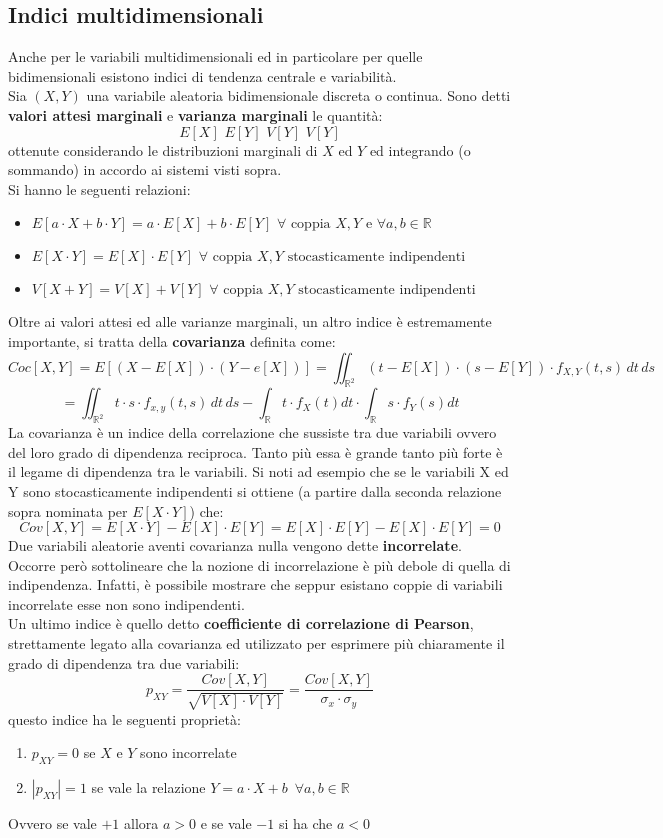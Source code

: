 \documentclass[a4paper,12pt, oneside]{book}
\begin{document}
\subsection{Indici multidimensionali}
Anche per le variabili multidimensionali ed in particolare per quelle bidimensionali esistono indici di tendenza centrale e variabilità.\\
Sia $(X,Y)$ una variabile aleatoria bidimensionale discreta o continua. Sono detti \textbf{valori attesi marginali} e \textbf{varianza marginali }le quantità:
\[E[X]\,\,E[Y]\,\,V[Y]\,\,V[Y]\]
ottenute considerando le distribuzioni marginali di $X$ ed $Y $ ed integrando (o sommando) in accordo ai sistemi visti sopra.\\
Si hanno le seguenti relazioni:
\begin{itemize}
\item $E[a\cdot X +b \cdot Y]=a\cdot E[X] + b\cdot E[Y]\,\,\forall \mbox{ coppia }X,Y \mbox{ e }\forall a,b\in\mathbb{R}$
\item $E[X \cdot Y]= E[X]\cdot E[Y]\,\,\forall \mbox{ coppia }X,Y \mbox{ stocasticamente indipendenti}$
\item $V[X + Y]= V[X]+ V[Y]\,\,\forall \mbox{ coppia }X,Y \mbox{ stocasticamente indipendenti}$
\end{itemize}
Oltre ai valori attesi ed alle varianze marginali, un altro indice è estremamente importante, si tratta della \textbf{covarianza} definita come:
\[Coc[X,Y]=E[(X-E[X])\cdot(Y-e[X])]=\iint_{\mathbb{R}^2} (t-E[X])\cdot (s-E[Y])\cdot f_{X,Y}(t,s)\,dt\,ds\]
\[=\iint_{\mathbb{R}^2} t \cdot s\cdot f_{x,y}(t,s)\,dt\,ds-\int_{\mathbb{R}}t\cdot f_X(t)dt\cdot \int_{\mathbb{R}}s\cdot f_Y(s)dt\]
La covarianza è un indice della correlazione che sussiste tra due variabili ovvero del loro grado di dipendenza reciproca.
Tanto più essa è grande tanto più forte è il legame di dipendenza tra le variabili. Si noti ad esempio che se le variabili X ed Y sono stocasticamente indipendenti si ottiene (a partire dalla seconda relazione sopra nominata per $E[X\cdot Y]$) che:
\[Cov[X,Y]=E[X\cdot Y]-E[X]\cdot E[Y]=E[X]\cdot E[Y]-E[X]\cdot E[Y]=0\]
Due variabili aleatorie aventi covarianza nulla vengono dette \textbf{incorrelate}. Occorre però sottolineare che la nozione di incorrelazione è più debole di quella di
indipendenza. Infatti, è possibile mostrare che seppur esistano coppie di variabili incorrelate esse
non sono indipendenti.\\
Un ultimo indice è quello detto \textbf{coefficiente di correlazione di Pearson}, strettamente legato alla covarianza ed utilizzato per esprimere più chiaramente il grado di dipendenza tra due variabili:
\[p_{XY}=\frac{Cov[X,Y]}{\sqrt{V[X]\cdot V[Y]}}=\frac{Cov[X,Y]}{\sigma_x\cdot \sigma_y}\]
questo indice ha le seguenti proprietà:
\begin{enumerate}
\item $p_{XY}=0$ se $X$ e $Y$ sono incorrelate
\item $|p_{XY}|=1$ se vale la relazione $Y=a\cdot X+b\,\,\,\forall a,b\in \mathbb{R}$
\end{enumerate}
Ovvero se vale $+1$ allora $a>0$ e se vale $-1$ si ha che $a<0$
\newpage
\end{document}
